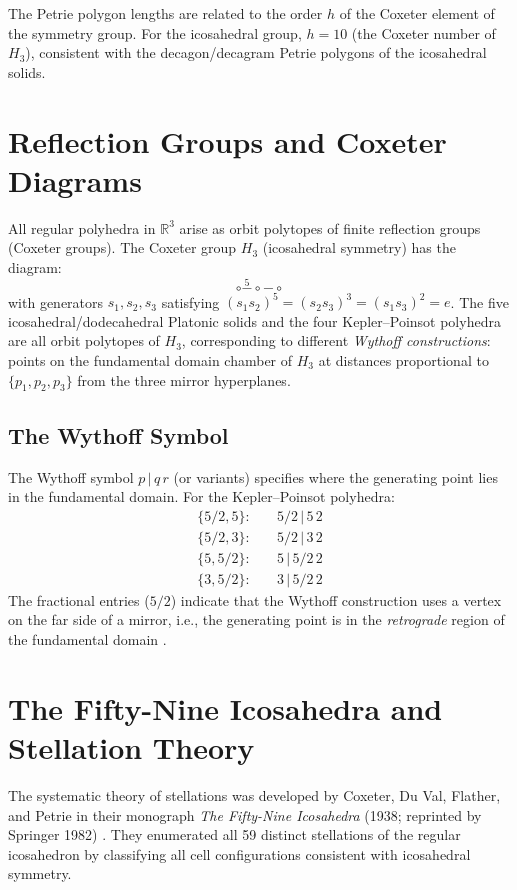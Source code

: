 The Petrie polygon lengths are related to the order $h$ of the
Coxeter element of the symmetry group.  For the icosahedral
group, $h=10$ (the Coxeter number of $H_3$), consistent with
the decagon/decagram Petrie polygons of the icosahedral solids.

\section{Reflection Groups and Coxeter Diagrams}
\label{sec:reflection-groups}

All regular polyhedra in $\mathbb{R}^3$ arise as orbit
polytopes of finite reflection groups (Coxeter groups).  The
Coxeter group $H_3$ (icosahedral symmetry) has the diagram:
\[
  \circ \overset{5}{-} \circ \overset{}{-} \circ
\]
with generators $s_1, s_2, s_3$ satisfying
$(s_1 s_2)^5 = (s_2 s_3)^3 = (s_1 s_3)^2 = e$.
The five icosahedral/dodecahedral Platonic solids and the four
Kepler–Poinsot polyhedra are all orbit polytopes of $H_3$,
corresponding to different \emph{Wythoff constructions}: points
on the fundamental domain chamber of $H_3$ at distances
proportional to $\{p_1, p_2, p_3\}$ from the three mirror
hyperplanes.

\subsection{The Wythoff Symbol}
\label{ssec:wythoff}

The Wythoff symbol $p\,|\,q\,r$ (or variants) specifies where
the generating point lies in the fundamental domain.  For the
Kepler–Poinsot polyhedra:
\begin{align*}
  \{5/2,5\}: &\quad 5/2\,|\,5\,2 \\
  \{5/2,3\}: &\quad 5/2\,|\,3\,2 \\
  \{5,5/2\}: &\quad 5\,|\,5/2\,2 \\
  \{3,5/2\}: &\quad 3\,|\,5/2\,2
\end{align*}
The fractional entries ($5/2$) indicate that the Wythoff
construction uses a vertex on the far side of a mirror, i.e.,
the generating point is in the \emph{retrograde} region of the
fundamental domain \cite{coxeter_regular_polytopes}.

\section{The Fifty-Nine Icosahedra and Stellation Theory}
\label{sec:fifty-nine}

The systematic theory of stellations was developed by Coxeter,
Du Val, Flather, and Petrie in their monograph \emph{The
Fifty-Nine Icosahedra} (1938; reprinted by Springer 1982)
\cite{coxeter_fifty_nine_icosahedra}.  They enumerated all 59 distinct
stellations of the regular icosahedron by classifying all
cell configurations consistent with icosahedral symmetry.

